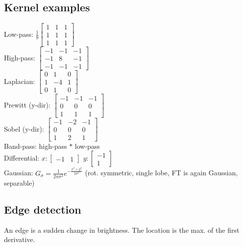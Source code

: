 \documentclass[a4paper,10pt]{article}
\begin{document}
\subsection{Kernel examples}
Low-pass: \( \frac{1}{9} \left[\begin{smallmatrix} 1 & 1 & 1 \\ 1 & 1 & 1 \\ 1 & 1 & 1 \end{smallmatrix}\right]  \)\\
High-pass: \( \left[\begin{smallmatrix} -1 & -1 & -1 \\ -1 & 8 & -1 \\ -1 & -1 & -1 \end{smallmatrix}\right]  \)\\
Laplacian: \( \left[\begin{smallmatrix} 0 & 1 & 0 \\ 1 & -4 & 1 \\ 0 & 1 & 0 \end{smallmatrix}\right]  \)\\
Prewitt (y-dir): \( \left[\begin{smallmatrix} -1 & -1 & -1 \\ 0 & 0 & 0 \\ 1 & 1 & 1 \end{smallmatrix}\right]  \)\\
Sobel (y-dir): \( \left[\begin{smallmatrix} -1 & -2 & -1 \\ 0 & 0 & 0 \\ 1 & 2 & 1 \end{smallmatrix}\right]  \)\\
Band-pass: high-pass \( * \) low-pass\\
Differential: \( x: \left[\begin{smallmatrix} -1 & 1 \end{smallmatrix}\right] \) \( y: \left[\begin{smallmatrix} -1 \\ 1 \end{smallmatrix}\right] \)
\\
Gaussian: \( G_\sigma = \frac{1}{2\pi \sigma^2} e^{-\frac{x^2+y^2}{2\sigma^2}} \) (rot. symmetric, single lobe, FT is again Gaussian, separable)

\subsection{Edge detection}
An edge is a sudden change in brightness. The location is the max. of the first derivative.
\end{document}
